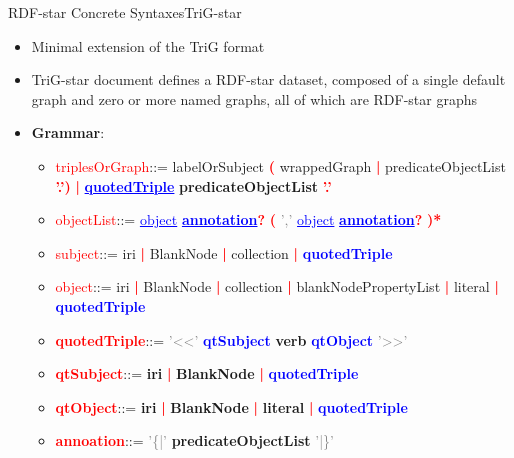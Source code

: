 \documentclass[aspectratio=169]{beamer}
\begin{document}
\begin{frame}{RDF-star Concrete Syntaxes}{TriG-star}
    \begin{itemize}
        \item Minimal extension of the TriG format
        \item TriG-star document defines a RDF-star dataset, composed of a single default graph and zero or more named graphs, all of which are RDF-star graphs
        \item \textbf{Grammar}:
        \begin{itemize}
            \item \textcolor{red}{triplesOrGraph}\quad::= labelOrSubject \textcolor{red}{\textbf{(}} wrappedGraph \textcolor{red}{\textbf{|}} predicateObjectList \textcolor{red}{\textbf{'.')}} \textcolor{red}{\textbf{|}} \textcolor{blue}{\textbf{\underline{quotedTriple}}} \textbf{predicateObjectList} \textcolor{red}{\textbf{'.'}}
            \item \textcolor{red}{objectList}\quad\quad\quad::= \textcolor{blue}{\underline{object}} \textcolor{blue}{\textbf{\underline{annotation}}}\textcolor{red}{\textbf{?}} \textcolor{red}{\textbf{(}} \textcolor{gray}{','} \textcolor{blue}{\underline{object}} \textcolor{blue}{\textbf{\underline{annotation}}}\textcolor{red}{\textbf{?}} \textcolor{red}{\textbf{)*}}
            \item \textcolor{red}{subject}\quad::= iri \textcolor{red}{\textbf{|}} BlankNode \textcolor{red}{\textbf{|}} collection \textcolor{red}{\textbf{|}} \textcolor{blue}{\textbf{quotedTriple}}
            \item \textcolor{red}{object}\quad::= iri \textcolor{red}{\textbf{|}} BlankNode \textcolor{red}{\textbf{|}} collection \textcolor{red}{\textbf{|}} blankNodePropertyList \textcolor{red}{\textbf{|}} literal \textcolor{red}{\textbf{|}} \textcolor{blue}{\textbf{quotedTriple}}
            \item \textcolor{red}{\textbf{quotedTriple}}\quad::= \textcolor{gray}{'<<'} \textcolor{blue}{\textbf{qtSubject}} \textbf{verb} \textcolor{blue}{\textbf{qtObject}} \textcolor{gray}{'>>'}
            \item \textcolor{red}{\textbf{qtSubject}}\quad::= \textbf{iri} \textcolor{red}{\textbf{|}} \textbf{BlankNode} \textcolor{red}{\textbf{|}} \textcolor{blue}{\textbf{quotedTriple}}
            \item \textcolor{red}{\textbf{qtObject}}\quad::= \textbf{iri} \textcolor{red}{\textbf{|}} \textbf{BlankNode} \textcolor{red}{\textbf{|}} \textbf{literal} \textcolor{red}{\textbf{|}} \textcolor{blue}{\textbf{quotedTriple}}
            \item \textcolor{red}{\textbf{annoation}}\quad::= \textcolor{gray}{'\{|'} \textbf{predicateObjectList} \textcolor{gray}{'|\}'}
        \end{itemize}
    \end{itemize}
\end{frame}
\end{document}
